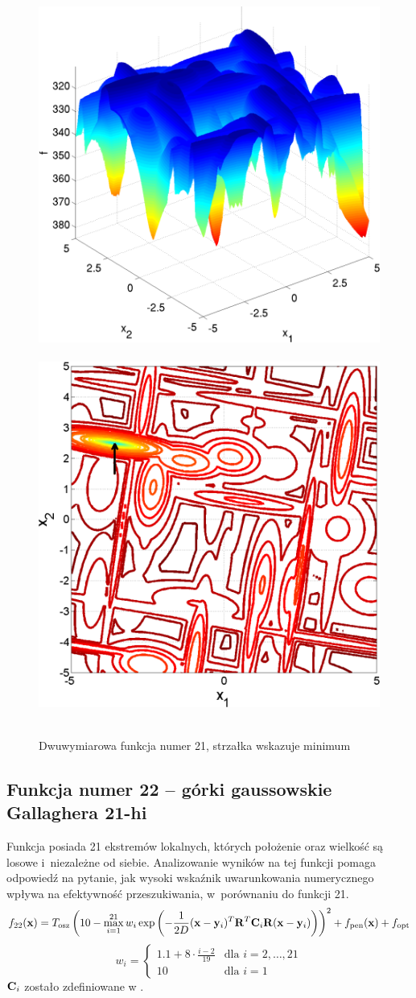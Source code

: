 \documentclass[a4paper,onecolumn,oneside,12pt,wide,floatssmall]{mwrep}
\theoremstyle{definition}
\theoremstyle{plain}%
\theoremstyle{remark}
\begin{document}
\begin{figure}[H]
\centering
\mbox{
\includegraphics[width=.45\textwidth]{img/21.png} \quad
\includegraphics[width=.45\textwidth]{img/21a.png} 
}
\caption{Dwuwymiarowa funkcja numer 21, strzałka wskazuje minimum \cite{noiseless}}
\end{figure}

\subsection{Funkcja numer 22 -- górki gaussowskie Gallaghera 21-hi}

Funkcja posiada 21 ekstremów lokalnych, których położenie oraz wielkość są losowe i~niezależne od siebie.
Analizowanie wyników na tej funkcji pomaga odpowiedź na pytanie, 
jak wysoki wskaźnik uwarunkowania numerycznego wpływa na efektywność przeszukiwania,
w~porównaniu do funkcji 21.
$$ f_{22}(\bold{x}) = T_\text{osz}\left(10-\max_{i=1}^{21}w_i\exp\left(-\frac{1}{2D}(\bold{x}-\bold{y}_i)^T\bold{R}^T\bold{C}_i\bold{R}(\bold{x}-\bold{y}_i)\right)\right)^2 + f_\text{pen}(\bold{x}) + f_\text{opt} $$
\[
w_i =
\begin{cases} 
1.1 + 8 \cdot \frac{i-2}{19} & \mbox{dla } i = 2, \dots, 21 \\ 
10 & \mbox{dla } i = 1
\end{cases}
\] 
$\bold{C}_i$ zostało zdefiniowane w \cite{noiseless}. 
\end{document}
